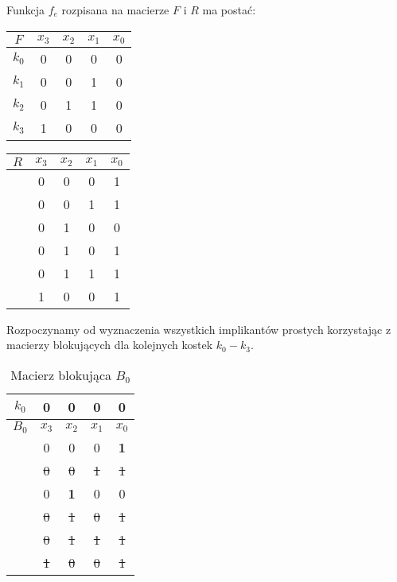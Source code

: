 \setcounter{implicant_counter}{0}

Funkcja $f_e$ rozpisana na macierze $F$ i $R$ ma postać:
\begin{center}
    \begin{tabular}[t]{ |c|c c c c|}
        \hline
        $F$ & $x_3$ & $x_2$ & $x_1$ & $x_0$ \\
        \hline
        $k_0$ & 0 & 0 & 0 & 0 \\
        $k_1$ & 0 & 0 & 1 & 0 \\
        $k_2$ & 0 & 1 & 1 & 0 \\
        $k_3$ & 1 & 0 & 0 & 0 \\
        \hline
    \end{tabular}
    \hspace{1cm}
    \begin{tabular}[t]{ |c|c c c c| }
        \hline
        $R$ & $x_3$ & $x_2$ & $x_1$ & $x_0$ \\
        \hline
        & 0 & 0 & 0 & 1 \\
        & 0 & 0 & 1 & 1 \\
        & 0 & 1 & 0 & 0 \\
        & 0 & 1 & 0 & 1 \\
        & 0 & 1 & 1 & 1 \\
        & 1 & 0 & 0 & 1 \\
        \hline
    \end{tabular}
\end{center}

Rozpoczynamy od wyznaczenia wszystkich implikantów prostych korzystając z macierzy blokujących dla kolejnych kostek
$k_0-k_3$.

\begin{table}[H]
    \centering
    \begin{tabular}[t]{ |c|c c c c| }
        \hline
        $k_0$ & 0 & 0 & 0 & 0 \\
        \hline\hline
        $B_0$ & $x_3$ & $x_2$ & $x_1$ & $x_0$ \\
        \hline
        & 0 & 0 & 0 & \textbf{1} \\
        & \sout{0} & \sout{0} & \sout{1} & \sout{1} \\
        & 0 & \textbf{1} & 0 & 0 \\
        & \sout{0} & \sout{1} & \sout{0} & \sout{1} \\
        & \sout{0} & \sout{1} & \sout{1} & \sout{1} \\
        & \sout{1} & \sout{0} & \sout{0} & \sout{1} \\
        \hline
    \end{tabular}
    \caption{Macierz blokująca $B_0$}\label{tab:b0e}
\end{table}


